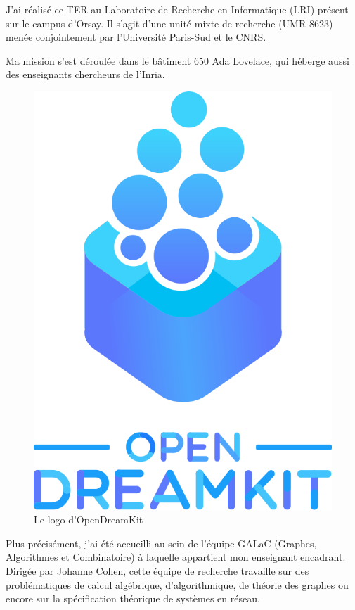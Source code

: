 \documentclass[12pt,a4paper]{report}
\begin{document}
J'ai réalisé ce TER au Laboratoire de Recherche en Informatique (LRI) présent sur le campus d'Orsay. Il s'agit d'une unité mixte de recherche (UMR 8623) menée conjointement par l'Université Paris-Sud et le CNRS.

Ma mission s'est déroulée dans le bâtiment 650 Ada Lovelace, qui héberge aussi des enseignants chercheurs de l'Inria.

\begin{figure}[h]
	\centering
	\includegraphics[scale=0.2]{logo-odk.png}
	\caption{Le logo d'OpenDreamKit}
\end{figure}

Plus précisément, j'ai été accueilli au sein de l'équipe GALaC (Graphes, Algorithmes et Combinatoire) à laquelle appartient mon enseignant encadrant. Dirigée par Johanne Cohen, cette équipe de recherche travaille sur des problématiques de calcul algébrique, d'algorithmique, de théorie des graphes ou encore sur la spécification théorique de systèmes en réseau.
\end{document}
